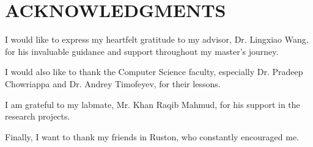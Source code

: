 \chapter*{ACKNOWLEDGMENTS}

I would like to express my heartfelt gratitude to my advisor, Dr. Lingxiao Wang, for his invaluable guidance and support throughout my master's journey.

I would also like to thank the Computer Science faculty, especially Dr. Pradeep Chowriappa and Dr. Andrey Timofeyev, for their lessons.

I am grateful to my labmate, Mr. Khan Raqib Mahmud, for his support in the research projects.

Finally, I want to thank my friends in Ruston, who constantly encouraged me.
